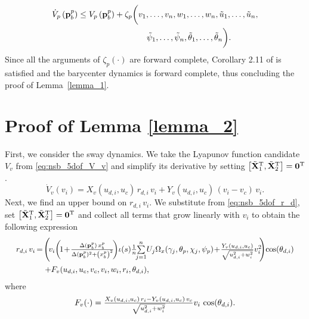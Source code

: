 \begin{equation}
    \begin{split}
        \dot{V}_p\left(\mathbf{p}_b^p\right) \leq V_p\left(\mathbf{p}_b^p\right) + \zeta_p\bigg(&v_1, \ldots, v_n, w_1, \ldots, w_n, \tilde{u}_1, \ldots, \tilde{u}_n, \\
        &\quad \tilde{\psi}_1, \ldots, \tilde{\psi}_n, \tilde{\theta}_1, \ldots, \tilde{\theta}_n\bigg).
    \end{split}
\end{equation}
Since all the arguments of $\zeta_p(\cdot)$ are forward complete, Corollary 2.11 of \cite{angeli_forward_1999} is satisfied and the barycenter dynamics is forward complete, thus concluding the proof of Lemma~\ref{lemma_1}.

\section{Proof of Lemma \ref{lemma_2}}
\label{app:5dof_nsb_lemma_2}
First, we consider the sway dynamics.
We take the Lyapunov function candidate $V_v$ from \eqref{eq:nsb_5dof_V_v} and simplify its derivative by setting $\left[\tilde{\mathbf{X}}_1^{\mathrm{T}}, \tilde{\mathbf{X}}_2^{\mathrm{T}}\right] = \mathbf{0}^{\mathrm{T}}$.
\begin{equation}
    \dot{V}_v(v_i) = X_v\left(u_{d,i}, u_c\right)\,r_{d,i}\,v_i + Y_v\left(u_{d,i}, u_c\right)\,\left(v_i - v_c\right)\,v_i. \label{eq:nsb_5dof_V_v_dot_2}
\end{equation}
Next, we find an upper bound on $r_{d,i}\,v_i$.
We substitute from \eqref{eq:nsb_5dof_r_d}, set $\left[\tilde{\mathbf{X}}_1^{\mathrm{T}}, \tilde{\mathbf{X}}_2^{\mathrm{T}}\right] = \mathbf{0}^{\mathrm{T}}$ and collect all terms that grow linearly with $v_i$ to obtain the following expression
\begin{align}
    \scale[0.95]{r_{d,i}\,v_i}\, &\scale[0.95]{= \!\left(\! v_i\!\left(\!1 \!+\! \frac{\Delta(\mat{p}_b^p)\,x_b^p}{\Delta(\mat{p}_b^p)^2 + \left(x_b^p\right)^2}\!\right)\! \iota(s) \frac{1}{n}\!\! \sum\limits_{j=1}^n \!U_j\Omega_x(\gamma_j, \theta_p, \chi_j, \psi_p) \!+\! \frac{Y_v(u_{d,i}, u_c)}{\sqrt{u_{d,i}^2 + w_i^2}}v_i^{2\!}\! \right)\! \cos(\theta_{d,i})} \nonumber \\
    &\quad \scale[0.95]{+ F_v(u_{d,i}, u_c, v_c, v_i, w_i, r_i, \theta_{d, i}),}
\end{align}
where
\begin{equation}
    \scale[1]{F_v(\cdot) = \frac{X_v(u_{d,i}, u_c)\,r_i - Y_v(u_{d,i}, u_c)\,v_c}{\sqrt{u_{d,i}^2 + w_i^2}} v_i \, \cos(\theta_{d,i}).}
\end{equation}
